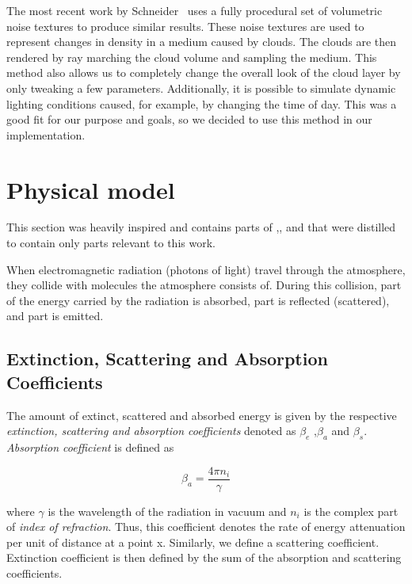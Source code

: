 \documentclass{ctuthesis}
\begin{document}
The most recent work by Schneider~\cite{schneider2015real} uses a fully procedural set of volumetric noise
textures to produce similar results. These noise textures are used to represent changes in density
in a medium caused by clouds. The clouds are then rendered by ray marching the cloud volume and sampling the 
medium. This method also allows us to completely change the overall look of the cloud layer by only tweaking a few
parameters. Additionally, it is possible to simulate dynamic lighting conditions caused, for example, by 
changing the time of day. This was a good fit for our purpose and goals, so we decided to use this method in our
implementation.

\chapter{Physical model}
This section was heavily inspired and contains parts of \cite{petty_2006},\cite{hillaire_2020}, and
\cite{costa_bock_emmart_hansen_ynnerman_silva_2021} that were distilled to contain only parts
relevant to this work. 

\hfill

When electromagnetic radiation (photons of light) travel through the atmosphere, they collide
with molecules the atmosphere consists of. During this collision, part of the energy carried by
the radiation is absorbed, part is reflected (scattered), and part is emitted.

\section{Extinction, Scattering and Absorption Coefficients}
The amount of extinct, scattered and absorbed energy is given by the respective 
\textit{extinction, scattering and absorption coefficients} denoted as 
$\beta_{e}$ ,$\beta_{a}$ and $\beta_{s} $. \textit{Absorption coefficient} is defined as 

\begin{equation}
    \beta_{a} = \frac{4 \pi n_{i}}{\gamma}
\end{equation}

where $\gamma$ is the wavelength of the radiation in vacuum and $n_{i}$ is the complex part of 
\textit{index of refraction}. Thus, this coefficient denotes the rate of energy attenuation per unit of distance at a point x.
Similarly, we define a scattering coefficient. Extinction coefficient 
is then defined by the sum of the absorption and scattering coefficients. 
\end{document}
